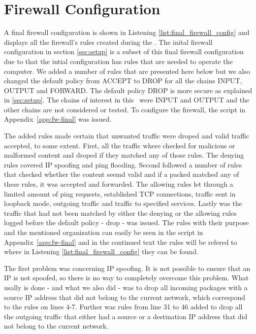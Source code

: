 \section{Firewall Configuration}
\label{sec:config}

A final firewall configuration is shown in Listening \ref{list:final_firewall_config} and displays all the firewall's rules created during the \lab. The inital firewall configuration in section \ref{sec:setup} is a subset of this final firewall configuration due to that the intial configuration has rules that are needed to operate the computer. We added a number of rules that are presented here below but we also changed the default policy from ACCEPT to DROP for all the chains INPUT, OUTPUT and FORWARD. The default policy DROP is more secure as explained in \ref{sec:setup}. The chains of interest in this \lab ~were INPUT and OUTPUT and the other chains are not considered or tested. To configure the firewall, the script in Appendix~\ref{app:fw-final} was issued.

The added rules made certain that unwanted traffic were droped and valid traffic accepted, to some extent. First, all the traffic where checked for malicious or malformed content and droped if they matched any of those rules. The denying rules covered IP spoofing and ping flooding. Second followed a number of rules that checked whether the content seemd valid and if a packed matched any of these rules, it was accepted and forwarded. The allowing rules let through a limited amount of ping requests, established TCP connections, traffic sent in loopback mode, outgoing traffic and traffic to specified services. Lastly was the traffic that had not been matched by either the denying or the allowing rules logged before the default policy - drop - was issued. The rules with their purpose and the mentioned organization can easily be seen in the script in Appendix~\ref{app:fw-final} and in the continued text the rules will be refered to where in Listening \ref{list:final_firewall_config} they can be found.

The first problem was concerning IP spoofing. It is not possible to ensure that an IP is not spoofed, so there is no way to completely overcome this problem. What usally is done - and what we also did - was to drop all incoming packages with a source IP address that did not belong to the current network, which correspond to the rules on lines 4-7. Further was rules from line 31 to 46 added to drop all the outgoing traffic that either had a source or a destination IP address that did not belong to the current network. 

